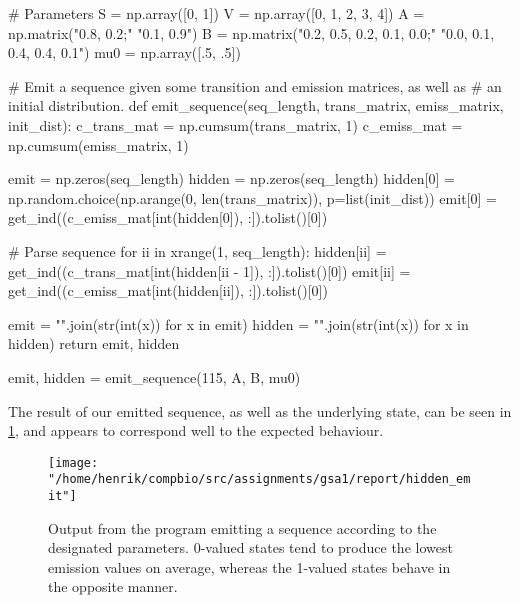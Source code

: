 \documentclass[10pt]{article}\usepackage[]{graphicx}\usepackage[]{color}
\theoremstyle{plain}
\begin{document}
\begin{Schunk}
\begin{Sinput}
# Parameters
S = np.array([0, 1])
V = np.array([0, 1, 2, 3, 4])
A = np.matrix("0.8, 0.2;"
              "0.1, 0.9")
B = np.matrix("0.2, 0.5, 0.2, 0.1, 0.0;"
              "0.0, 0.1, 0.4, 0.4, 0.1")
mu0 = np.array([.5, .5])


# Emit a sequence given some transition and emission matrices, as well as
# an initial distribution.
def emit_sequence(seq_length, trans_matrix, emiss_matrix, init_dist):
    c_trans_mat = np.cumsum(trans_matrix, 1)
    c_emiss_mat = np.cumsum(emiss_matrix, 1)

    emit = np.zeros(seq_length)
    hidden = np.zeros(seq_length)
    hidden[0] = np.random.choice(np.arange(0, len(trans_matrix)), p=list(init_dist))
    emit[0] = get_ind((c_emiss_mat[int(hidden[0]), :]).tolist()[0])

    # Parse sequence
    for ii in xrange(1, seq_length):
        hidden[ii] = get_ind((c_trans_mat[int(hidden[ii - 1]), :]).tolist()[0])
        emit[ii] = get_ind((c_emiss_mat[int(hidden[ii]), :]).tolist()[0])

    emit = "".join(str(int(x)) for x in emit)
    hidden = "".join(str(int(x)) for x in hidden)
    return emit, hidden


emit, hidden = emit_sequence(115, A, B, mu0)
\end{Sinput}
\end{Schunk}
The result of our emitted sequence, as well as the underlying state, can be seen in \cref{fig:hidden_emit}, and appears to correspond well to the expected behaviour.



\begin{figure}[H]
  \centering
  \texttt{[image: "/home/henrik/compbio/src/assignments/gsa1/report/hidden\_emit"]}
  \caption{Output from the program emitting a sequence according to the designated parameters. 0-valued states tend to produce the lowest emission values on average, whereas the 1-valued states behave in the opposite manner.}
  \label{fig:hidden_emit}
\end{figure}
\end{document}
